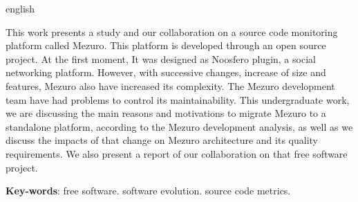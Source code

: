 \begin{resumo}[Abstract]
  \begin{otherlanguage*}{english} 
  
This work presents a study and our collaboration on a source code monitoring platform called Mezuro. This platform is developed through an open source project. At the first moment, It was designed as Noosfero plugin, a social networking platform.
%
However, with successive changes, increase of size and features, Mezuro also have increased its complexity. The Mezuro development team have had problems to control its maintainability.
%
This undergraduate work, we are discussing the main reasons and motivations to migrate Mezuro to a standalone platform, according to the Mezuro development analysis, as well as we discuss the impacts of that change on Mezuro architecture and its quality requirements.
%
We also present a report of our collaboration on that free software project.
  
  \vspace{\onelineskip}
 
  \noindent 
  \textbf{Key-words}: free software. software evolution. source code metrics.
  \end{otherlanguage*}
\end{resumo}


